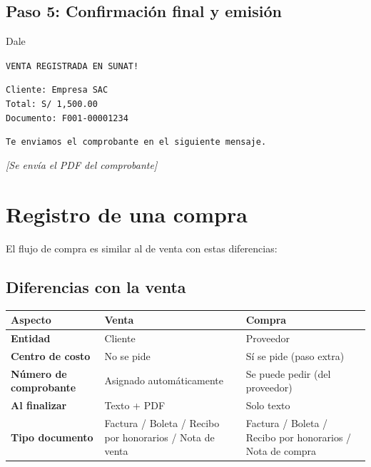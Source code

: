 \documentclass[12pt,a4paper]{article}
\begin{document}
\subsection{Paso 5: Confirmaci\'on final y emisi\'on}

\begin{mensajeusuario}
Dale
\end{mensajeusuario}

\begin{mensajebot}
\texttt{VENTA REGISTRADA EN SUNAT!}

\medskip
\texttt{Cliente: Empresa SAC} \\
\texttt{Total: S/ 1,500.00} \\
\texttt{Documento: F001-00001234}

\medskip
\texttt{Te enviamos el comprobante en el siguiente mensaje.}

\medskip
\textit{[Se env\'ia el PDF del comprobante]}
\end{mensajebot}

\section{Registro de una compra}

El flujo de compra es similar al de venta con estas diferencias:

\subsection{Diferencias con la venta}

\begin{center}
\begin{tabular}{>{\bfseries}l p{4.5cm} p{4.5cm}}
\toprule
Aspecto & Venta & Compra \\
\midrule
Entidad & Cliente & Proveedor \\
Centro de costo & No se pide & S\'i se pide (paso extra) \\
N\'umero de comprobante & Asignado autom\'aticamente & Se puede pedir (del proveedor) \\
Al finalizar & Texto + PDF & Solo texto \\
Tipo documento & Factura / Boleta / Recibo por honorarios / Nota de venta & Factura / Boleta / Recibo por honorarios / Nota de compra \\
\bottomrule
\end{tabular}
\end{center}
\end{document}
